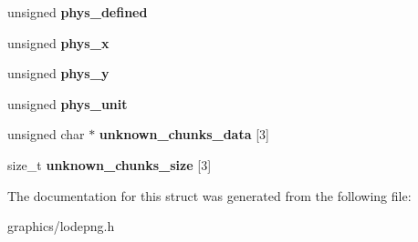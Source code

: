 \begin{DoxyCompactItemize}
\item 
\hypertarget{struct_lode_p_n_g_info_a9b8e29b7e7b4908a2de0275e01a828ed}{unsigned {\bfseries phys\+\_\+defined}}\label{struct_lode_p_n_g_info_a9b8e29b7e7b4908a2de0275e01a828ed}

\item 
\hypertarget{struct_lode_p_n_g_info_a1593fa6e1acc93f3b9de51c340bef94d}{unsigned {\bfseries phys\+\_\+x}}\label{struct_lode_p_n_g_info_a1593fa6e1acc93f3b9de51c340bef94d}

\item 
\hypertarget{struct_lode_p_n_g_info_a52ad7a105244d00f1e91c489eaf53f97}{unsigned {\bfseries phys\+\_\+y}}\label{struct_lode_p_n_g_info_a52ad7a105244d00f1e91c489eaf53f97}

\item 
\hypertarget{struct_lode_p_n_g_info_ad6f2171d9f87716e5010f6c5352f9855}{unsigned {\bfseries phys\+\_\+unit}}\label{struct_lode_p_n_g_info_ad6f2171d9f87716e5010f6c5352f9855}

\item 
\hypertarget{struct_lode_p_n_g_info_a8347476da7fc2fc6af4ec7ed44b638c6}{unsigned char $\ast$ {\bfseries unknown\+\_\+chunks\+\_\+data} \mbox{[}3\mbox{]}}\label{struct_lode_p_n_g_info_a8347476da7fc2fc6af4ec7ed44b638c6}

\item 
\hypertarget{struct_lode_p_n_g_info_a25a81d760759bd0383ae5a81ba83911d}{size\+\_\+t {\bfseries unknown\+\_\+chunks\+\_\+size} \mbox{[}3\mbox{]}}\label{struct_lode_p_n_g_info_a25a81d760759bd0383ae5a81ba83911d}

\end{DoxyCompactItemize}


The documentation for this struct was generated from the following file\+:\begin{DoxyCompactItemize}
\item 
graphics/lodepng.\+h\end{DoxyCompactItemize}
